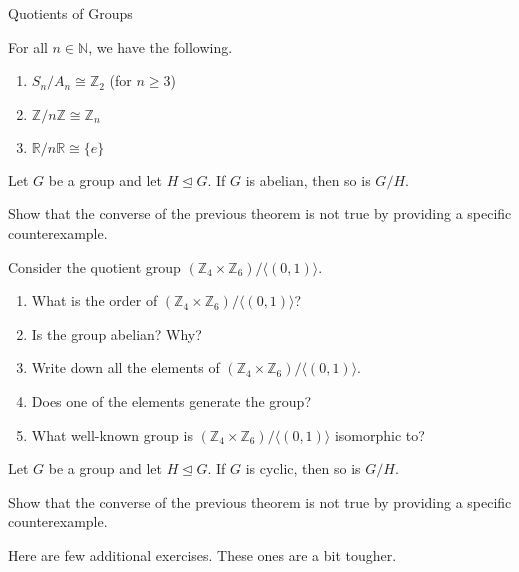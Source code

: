\begin{section}{Quotients of Groups}
\begin{theorem}
For all $n\in \mathbb{N}$, we have the following.
\begin{enumerate}[label=\rm{(\alph*)}]
\item $S_n/A_n\cong \mathbb{Z}_2$ (for $n\geq 3$)
\item $\mathbb{Z}/n\mathbb{Z}\cong \mathbb{Z}_n$
\item $\mathbb{R}/n\mathbb{R}\cong \{e\}$
\end{enumerate}
\end{theorem}

\begin{theorem}
Let $G$ be a group and let $H\trianglelefteq G$.  If $G$ is abelian, then so is $G/H$.
\end{theorem}

\begin{problem}
Show that the converse of the previous theorem is not true by providing a specific counterexample.
\end{problem}

\begin{problem}
Consider the quotient group $(\mathbb{Z}_4\times \mathbb{Z}_6)/\langle (0,1)\rangle$.
\begin{enumerate}[label=\rm{(\alph*)}]
\item What is the order of $(\mathbb{Z}_4\times \mathbb{Z}_6)/\langle (0,1)\rangle$?
\item Is the group abelian?  Why?
\item Write down all the elements of $(\mathbb{Z}_4\times \mathbb{Z}_6)/\langle (0,1)\rangle$.
\item Does one of the elements generate the group?
\item What well-known group is $(\mathbb{Z}_4\times \mathbb{Z}_6)/\langle (0,1)\rangle$ isomorphic to?
\end{enumerate}
\end{problem}

\begin{theorem}
Let $G$ be a group and let $H\trianglelefteq G$.  If $G$ is cyclic, then so is $G/H$.
\end{theorem}

\begin{problem}
Show that the converse of the previous theorem is not true by providing a specific counterexample.
\end{problem}

Here are few additional exercises.  These ones are a bit tougher.


\end{section}
